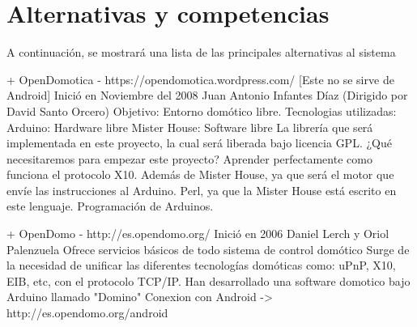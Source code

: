 \section{Alternativas y competencias}
    A continuación, se mostrará una lista de las principales alternativas al sistema
    \newline

    + OpenDomotica - https://opendomotica.wordpress.com/ [Este no se sirve de Android]
    \newline
        Inició en Noviembre del 2008
        \newline
        Juan Antonio Infantes Díaz (Dirigido por David Santo Orcero)
        \newline
        Objetivo: Entorno domótico libre.
            \newline
            Tecnologias utilizadas:
                \newline
                Arduino: Hardware libre
                \newline
                Mister House: Software libre
                \newline
                La librería que será implementada en este proyecto, la cual será liberada bajo licencia GPL.
                \newline
            ¿Qué necesitaremos para empezar este proyecto?
                \newline
                Aprender perfectamente como funciona el protocolo X10.
                \newline
                Además de Mister House, ya que será el motor que envíe las instrucciones al Arduino.
                \newline
                Perl, ya que la Mister House está escrito en este lenguaje.
                \newline
                Programación de Arduinos.
                \newline

    + OpenDomo - http://es.opendomo.org/
        \newline
        Inició en 2006
        \newline
        Daniel Lerch y Oriol Palenzuela
        \newline
        Ofrece servicios básicos de todo sistema de control domótico
        \newline
        Surge de la necesidad de unificar las diferentes tecnologías domóticas como: uPnP, X10, EIB, etc, con el protocolo TCP/IP.
        \newline
        Han desarrollado una software domotico bajo Arduino llamado "Domino"
        \newline
        Conexion con Android -> http://es.opendomo.org/android
